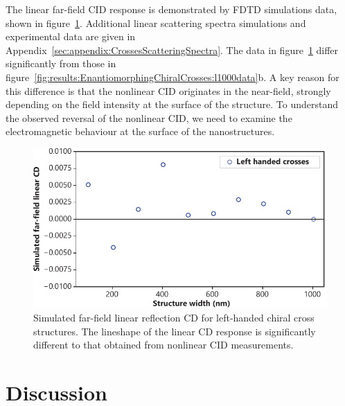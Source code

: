 The linear far-field CID response is demonstrated by FDTD simulations data, shown in figure~\ref{fig:results:EnantiomorphingChiralCrosses:reflectionsim}. Additional linear scattering spectra simulations and experimental data are given in Appendix~\ref{sec:appendix:CrossesScatteringSpectra}. The data in figure~\ref{fig:results:EnantiomorphingChiralCrosses:reflectionsim} differ significantly from those in figure~\ref{fig:results:EnantiomorphingChiralCrosses:l1000data}b. A key reason for this difference is that the nonlinear CID originates in the near-field, strongly depending on the field intensity at the surface of the structure. To understand the observed reversal of the nonlinear CID, we need to examine the electromagnetic behaviour at the surface of the nanostructures. 

\begin{figure}[htb!]	
    \centering	
    \includegraphics[scale=1]{./figures/results/EnantiomorphingChiralCrosses/reflection_sim.pdf}
    \caption{\label{fig:results:EnantiomorphingChiralCrosses:reflectionsim}
    Simulated far-field linear reflection CD for left-handed chiral cross structures. The lineshape of the linear CD response is significantly different to that obtained from nonlinear CID measurements.}	
\end{figure}

\section{Discussion}\label{sec:results:EnantiomorphingChiralCrosses:discussion}

